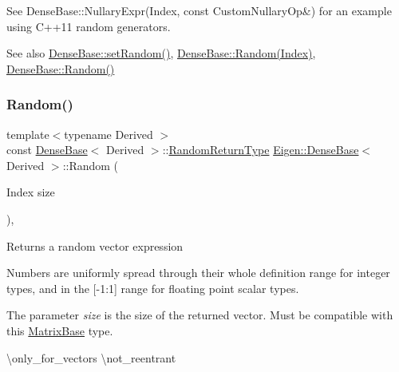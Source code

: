 See Dense\+Base\+::\+Nullary\+Expr(\+Index, const Custom\+Nullary\+Op\&) for an example using C++11 random generators.

\begin{DoxySeeAlso}{See also}
\mbox{\hyperlink{class_eigen_1_1_dense_base_ac476e5852129ba32beaa1a8a3d7ee0db}{Dense\+Base\+::set\+Random()}}, \mbox{\hyperlink{class_eigen_1_1_dense_base_a7eb5f974a8f0b67eac7080db1da0e308}{Dense\+Base\+::\+Random(\+Index)}}, \mbox{\hyperlink{class_eigen_1_1_dense_base_ae814abb451b48ed872819192dc188c19}{Dense\+Base\+::\+Random()}} 
\end{DoxySeeAlso}
\mbox{\label{class_eigen_1_1_dense_base_a7eb5f974a8f0b67eac7080db1da0e308}} 
\subsubsection{\texorpdfstring{Random()}{Random()}\hspace{0.1cm}{\footnotesize\ttfamily [2/3]}}
{\footnotesize\ttfamily template$<$typename Derived $>$ \\
const \mbox{\hyperlink{class_eigen_1_1_dense_base}{Dense\+Base}}$<$ Derived $>$\+::\mbox{\hyperlink{class_eigen_1_1_cwise_nullary_op}{Random\+Return\+Type}} \mbox{\hyperlink{class_eigen_1_1_dense_base}{Eigen\+::\+Dense\+Base}}$<$ Derived $>$\+::Random (\begin{DoxyParamCaption}\item[{Index}]{size }\end{DoxyParamCaption})\hspace{0.3cm}{\ttfamily [inline]}, {\ttfamily [static]}}

\begin{DoxyReturn}{Returns}
a random vector expression
\end{DoxyReturn}
Numbers are uniformly spread through their whole definition range for integer types, and in the \mbox{[}-\/1\+:1\mbox{]} range for floating point scalar types.

The parameter {\itshape size} is the size of the returned vector. Must be compatible with this \mbox{\hyperlink{class_eigen_1_1_matrix_base}{Matrix\+Base}} type.

\textbackslash{}only\+\_\+for\+\_\+vectors \textbackslash{}not\+\_\+reentrant


